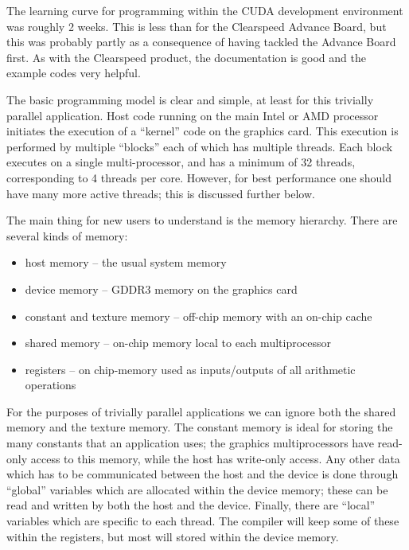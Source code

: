 \documentclass[12pt]{article}
\begin{document}
The learning curve for programming within the CUDA development environment
was roughly 2 weeks.  This is less than for the Clearspeed Advance Board,
but this was probably partly as a consequence of having tackled the Advance 
Board first.   As with the Clearspeed product, the documentation is good 
and the example codes very helpful.

The basic programming model is clear and simple, at least for this trivially 
parallel application. Host code running on the main Intel or AMD processor 
initiates the execution of a ``kernel'' code on the graphics card.  This 
execution is performed by multiple ``blocks'' each of which has multiple 
threads.  Each block executes on a single multi-processor, and has a minimum 
of 32 threads, corresponding to 4 threads per core.  However, for best 
performance one should have many more active threads; this is discussed 
further below.

The main thing for new users to understand is the memory hierarchy.  There
are several kinds of memory:
\begin{itemize}
\item
host memory -- the usual system memory
\item
device memory -- GDDR3 memory on the graphics card
\item
constant and texture memory -- off-chip memory with an on-chip cache
\item
shared memory -- on-chip memory local to each multiprocessor
\item
registers -- on chip-memory used as inputs/outputs of all arithmetic operations
\end{itemize}

For the purposes of trivially parallel applications we can ignore 
both the shared memory and the texture memory.  The constant memory is 
ideal for storing the many constants that an application uses; the graphics 
multiprocessors have read-only access to this memory, while the host has 
write-only access.  Any other data which has to be communicated between 
the host and the device is done through ``global'' variables which are allocated 
within the device memory; these can be read and written by both the host and the
device.  Finally, there are ``local'' variables which are specific to each thread.
The compiler will keep some of these within the registers, but most will
stored within the device memory.  
\end{document}

